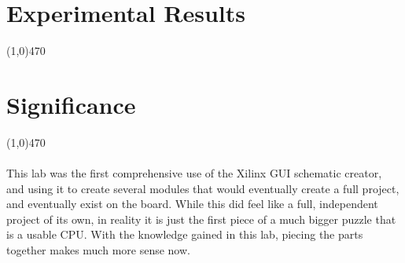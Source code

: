 \documentclass[12pt]{article}
\begin{document}
\section{Experimental Results}\vspace{-.7cm} \line(1,0){470}

%
%
%
%
%

	\newpage
\section{Significance} \vspace{-.7cm} \line(1,0){470}
	\paragraph{}
		This lab was the first comprehensive use of the Xilinx GUI schematic creator, and using it to create several modules that would eventually create a full project, and eventually exist on the board. While this did feel like a full, independent project of its own, in reality it is just the first piece of a much bigger puzzle that is a usable CPU. With the knowledge gained in this lab, piecing the parts together makes much more sense now. 
\end{document}
